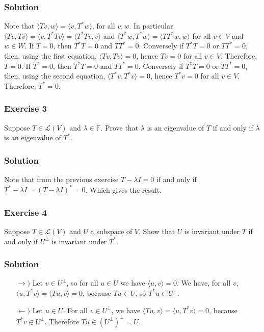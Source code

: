 \subsubsection*{Solution}

Note that $\langle Tv, w\rangle = \langle v, T^*w \rangle$, for all $v, w$.
In particular $\langle Tv, Tv \rangle = \langle v, T^*Tv \rangle = \langle T^*T v, v \rangle$ and $\langle T^*w, T^*w\rangle = \langle T T^* w, w \rangle$ for all $v \in V$ and $w \in W$.
If $T = 0$, then $T^*T = 0$ and $TT^* = 0$.
Conversely if $T^*T = 0$ or $TT^* = 0$, then, using the first equation, $\langle Tv, Tv \rangle = 0$, hence $Tv = 0$ for all $v \in V$.
Therefore, $T = 0$.
If $T^* = 0$, then $T^*T = 0$ and $TT^* = 0$.
Conversely if $T^*T = 0$ or $TT^* = 0$, then, using the second equation, $\langle T^*v, T^*v \rangle = 0$, hence $T^*v = 0$ for all $v \in V$.
Therefore, $T^* = 0$.


\subsubsection*{Exercise 3}

Suppose $T \in \mathcal{L}(V)$ and $\lambda \in \mathbb{F}$.
Prove that $\lambda$ is an eigenvalue of $T$ if and only if $\overline{\lambda}$ is an eigenvalue of $T^*$.


\subsubsection*{Solution}

Note that from the previous exercise $T - \lambda I = 0$ if and only if $T^* - \overline{\lambda} I = (T - \lambda I)^* = 0$.
Which gives the result.


\subsubsection*{Exercise 4}

Suppose $T \in \mathcal{L}(V)$ and $U$ a subspace of $V$.
Show that $U$ is invariant under $T$ if and only if $U^{\perp}$ is invariant under $T^*$.

\subsubsection*{Solution}

\begin{itemize}
    \item[$\rightarrow)$] Let $v \in U^{\perp}$, so for all $u \in U$ we have $\langle u, v \rangle = 0$.
        We have, for all $v$, $\langle u, T^*v\rangle = \langle Tu, v\rangle = 0$, because $Tu \in U$, so $T^*u \in U^{\perp}$.
    \item[$\leftarrow)$] Let $u \in U$.
        For all $v \in U^{\perp}$, we have $\langle Tu, v \rangle = \langle u, T^*v \rangle = 0$, because $T^*v \in U^{\perp}$.
        Therefore $Tu \in (U^{\perp})^{\perp} = U$.
\end{itemize}


